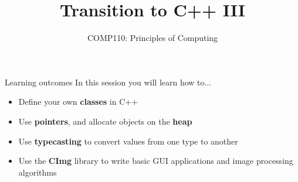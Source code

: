 \documentclass[xcolor={dvipsnames}]{beamer}\usepackage{etoolbox}\newtoggle{printable}\togglefalse{printable}
\begin{document}
\title{Transition to C++ III}   
\subtitle{COMP110: Principles of Computing}

\frame{\titlepage} 

\begin{frame}{Learning outcomes}
    In this session you will learn how to...
    \begin{itemize}
        \item Define your own \textbf{classes} in C++
        \item Use \textbf{pointers}, and allocate objects on the \textbf{heap}
        \item Use \textbf{typecasting} to convert values from one type to another
        \item Use the \textbf{CImg} library to write basic GUI applications and image processing algorithms
    \end{itemize}
\end{frame}

%
%
%



%
\end{document}
